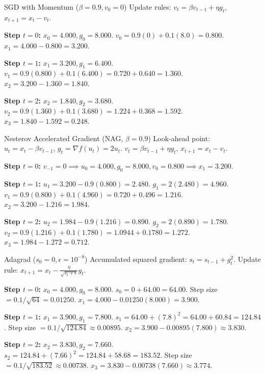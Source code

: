 \documentclass[a4paper,11pt]{article}
\begin{document}
\begin{worked}{SGD with Momentum ($\beta = 0.9, v_0 = 0$)}
Update rules: $v_t = \beta v_{t-1} + \eta g_t$, $x_{t+1} = x_t - v_t$.
\begin{steps}
  \item \textbf{Step $t=0$:} $x_0 = 4.000, g_0 = 8.000$.
        $v_0 = 0.9(0) + 0.1(8.0) = 0.800$.
        $x_1 = 4.000 - 0.800 = 3.200$.
  \item \textbf{Step $t=1$:} $x_1 = 3.200, g_1 = 6.400$.
        $v_1 = 0.9(0.800) + 0.1(6.400) = 0.720 + 0.640 = 1.360$.
        $x_2 = 3.200 - 1.360 = 1.840$.
  \item \textbf{Step $t=2$:} $x_2 = 1.840, g_2 = 3.680$.
        $v_2 = 0.9(1.360) + 0.1(3.680) = 1.224 + 0.368 = 1.592$.
        $x_3 = 1.840 - 1.592 = 0.248$.
\end{steps}
\end{worked}

\begin{worked}{Nesterov Accelerated Gradient (NAG, $\beta = 0.9$)}
Look-ahead point: $u_t = x_t - \beta v_{t-1}$, $g_t = \nabla f(u_t) = 2 u_t$.
$v_t = \beta v_{t-1} + \eta g_t$, $x_{t+1} = x_t - v_t$.
\begin{steps}
  \item \textbf{Step $t=0$:} $v_{-1} = 0 \implies u_0 = 4.000, g_0 = 8.000, v_0 = 0.800 \implies x_1 = 3.200$.
  \item \textbf{Step $t=1$:} $u_1 = 3.200 - 0.9(0.800) = 2.480$.
        $g_1 = 2(2.480) = 4.960$.
        $v_1 = 0.9(0.800) + 0.1(4.960) = 0.720 + 0.496 = 1.216$.
        $x_2 = 3.200 - 1.216 = 1.984$.
  \item \textbf{Step $t=2$:} $u_2 = 1.984 - 0.9(1.216) = 0.890$.
        $g_2 = 2(0.890) = 1.780$.
        $v_2 = 0.9(1.216) + 0.1(1.780) = 1.0944 + 0.1780 = 1.272$.
        $x_3 = 1.984 - 1.272 = 0.712$.
\end{steps}
\end{worked}

\begin{worked}{Adagrad ($s_0 = 0, \epsilon = 10^{-8}$)}
Accumulated squared gradient: $s_t = s_{t-1} + g_t^2$.
Update rule: $x_{t+1} = x_t - \frac{\eta}{\sqrt{s_t + \epsilon}} g_t$.
\begin{steps}
  \item \textbf{Step $t=0$:} $x_0 = 4.000, g_0 = 8.000$.
        $s_0 = 0 + 64.00 = 64.00$.
        Step size $= 0.1 / \sqrt{64} = 0.01250$.
        $x_1 = 4.000 - 0.01250(8.000) = 3.900$.
  \item \textbf{Step $t=1$:} $x_1 = 3.900, g_1 = 7.800$.
        $s_1 = 64.00 + (7.8)^2 = 64.00 + 60.84 = 124.84$.
        Step size $= 0.1 / \sqrt{124.84} \approx 0.00895$.
        $x_2 = 3.900 - 0.00895(7.800) \approx 3.830$.
  \item \textbf{Step $t=2$:} $x_2 = 3.830, g_2 = 7.660$.
        $s_2 = 124.84 + (7.66)^2 = 124.84 + 58.68 = 183.52$.
        Step size $= 0.1 / \sqrt{183.52} \approx 0.00738$.
        $x_3 = 3.830 - 0.00738(7.660) \approx 3.774$.
\end{steps}
\end{worked}
\end{document}
